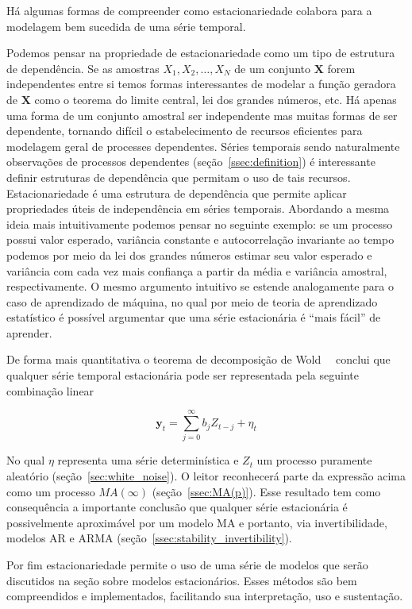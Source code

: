 Há algumas formas de compreender como estacionariedade colabora para a
modelagem bem sucedida de uma série temporal.

Podemos pensar na propriedade de estacionariedade como um tipo de estrutura de
dependência. Se as amostras $X_1, X_2, \dots, X_N$ de um conjunto $\mathbf{X}$
forem independentes entre si temos formas interessantes de modelar a função
geradora de $\mathbf{X}$ como o teorema do limite central, lei dos grandes
números, etc. Há apenas uma forma de um conjunto amostral ser independente mas
muitas formas de ser dependente, tornando difícil o estabelecimento de recursos
eficientes para modelagem geral de processes dependentes. Séries temporais
sendo naturalmente observações de processos dependentes
(seção~\ref{ssec:definition}) é interessante definir estruturas de dependência
que permitam o uso de tais recursos. Estacionariedade é uma estrutura de
dependência que permite aplicar propriedades úteis de independência em séries
temporais. Abordando a mesma ideia mais intuitivamente podemos pensar no
seguinte exemplo: se um processo possui valor esperado, variância constante e
autocorrelação invariante ao tempo podemos por meio da lei dos grandes números
estimar seu valor esperado e variância com cada vez mais confiança a partir da
média e variância amostral, respectivamente. O mesmo argumento intuitivo se
estende
analogamente para o caso de aprendizado de máquina, no qual por meio de teoria
de aprendizado estatístico é possível argumentar que uma série estacionária é
``mais fácil'' de aprender.

De forma mais quantitativa o teorema de decomposição de Wold~~\cite{chatfield}
conclui que qualquer série temporal estacionária pode ser representada pela
seguinte combinação linear

$$\mathbf{y}_t = \sum_{j=0}^\infty b_j Z_{t-j} + \eta_t$$

No qual $\eta$ representa uma série determinística e $Z_t$ um processo
puramente aleatório (seção~\ref{sec:white_noise}). O leitor reconhecerá parte da expressão
acima como um processo $MA(\infty)$ (seção~\ref{ssec:MA(p)}). Esse resultado tem
como consequência a importante conclusão que qualquer série estacionária é
possivelmente aproximável por um modelo MA e portanto, via invertibilidade,
modelos AR e ARMA (seção~\ref{ssec:stability_invertibility}).

Por fim estacionariedade permite o uso de uma série de modelos que serão
discutidos na seção sobre modelos estacionários. Esses métodos são bem
compreendidos e implementados, facilitando sua interpretação, uso e
sustentação.

